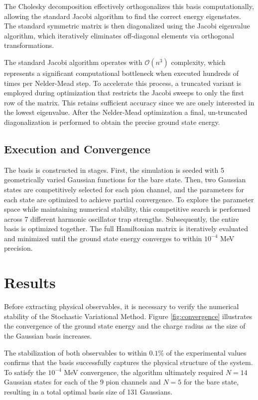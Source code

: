 \documentclass[a4paper,oneside,article,12pt]{memoir}
\begin{document}
The Cholesky decomposition effectively orthogonalizes this basis computationally, allowing the standard Jacobi algorithm to find the correct energy eigenstates.
The standard symmetric matrix is then diagonalized using the Jacobi eigenvalue algorithm, which iteratively eliminates off-diagonal elements via orthogonal transformations. 

The standard Jacobi algorithm operates with $\mathcal{O}(n^3)$ complexity, which represents a significant computational bottleneck when executed hundreds of times per Nelder-Mead step. To accelerate this process, a truncated variant is employed during optimization that restricts the Jacobi sweeps to only the first row of the matrix. This retains sufficient accuracy since we are onely interested in the lowest eigenvalue. After the Nelder-Mead optimization a final, un-truncated diagonalization is performed to obtain the precise ground state energy. 

\newpage
\section{Execution and Convergence}
The basis is constructed in stages. First, the simulation is seeded with 5 geometrically varied Gaussian functions for the bare state. Then, two Gaussian states are competitively selected for each pion channel, and the parameters for each state are optimized to achieve partial convergence. 
To explore the parameter space while maintaining numerical stability, this competitive search is performed across 7 different harmonic oscillator trap strengths. 
Subsequently, the entire basis is optimized together. The full Hamiltonian matrix is iteratively evaluated and minimized until the ground state energy converges to within $10^{-4}$ MeV precision.

\vspace{30pt}
\chapter{Results} \label{ch:results}
Before extracting physical observables, it is necessary to verify the numerical stability of the Stochastic Variational Method. Figure \ref{fig:convergence} illustrates the convergence of the ground state energy and the charge radius as the size of the Gaussian basis increases. 

The stabilization of both observables to within $0.1\%$ of the experimental values confirms that the basis successfully captures the physical structure of the system. To satisfy the $10^{-4}$ MeV convergence, the algorithm ultimately required $N=14$ Gaussian states for each of the 9 pion channels and $N=5$ for the bare state, resulting in a total optimal basis size of 131 Gaussians.
\end{document}
